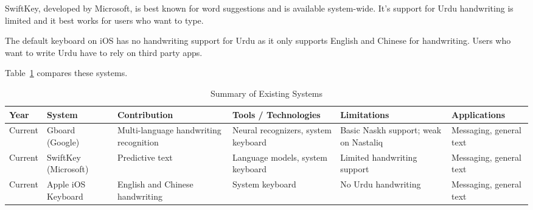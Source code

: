 \documentclass[12pt,a4paper]{report}
\begin{document}
SwiftKey, developed by Microsoft, is best known for word suggestions and is available system-wide. It's support for Urdu handwriting is limited and it best works for users who want to type.

The default keyboard on iOS has no handwriting support for Urdu as it only supports English and Chinese for handwriting. Users who want to write Urdu have to rely on third party apps.


Table~\ref{tab:sys} compares these systems.

\begin{table}[H]
\caption{Summary of Existing Systems}\label{tab:sys}
\centering\small\renewcommand{\arraystretch}{1.15}
\begin{tabular}{|p{0.55in}|p{0.8in}|p{1.0in}|p{0.95in}|p{1.0in}|p{0.7in}|}
\hline
\textbf{Year} & \textbf{System} & \textbf{Contribution} & \textbf{Tools / Technologies} & \textbf{Limitations} & \textbf{Applications}\\\hline
Current & Gboard (Google) & Multi-language handwriting recognition & Neural recognizers, system keyboard & Basic Naskh support; weak on Nastaliq & Messaging, general text\\\hline
Current & SwiftKey (Microsoft) & Predictive text & Language models, system keyboard & Limited handwriting support & Messaging, general text\\\hline
Current & Apple iOS Keyboard & English and Chinese handwriting & System keyboard & No Urdu handwriting & Messaging, general text\\\hline
\end{tabular}
\end{table}
\end{document}
